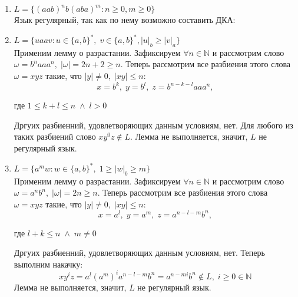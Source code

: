 \documentclass{article}
\begin{document}
    \begin{enumerate}
        \item \(L=\{(aab)^{n}b(aba)^{m} : n \geqslant 0, m \geqslant 0\}\)\\
        Язык регулярный, так как по нему возможно составить ДКА:
        \begin{center}
        \end{center}
    
        \item \(L = \{uaav : u \in \{a, b\}^*, \; v \in \{a, b\}^*, |u|_b \geqslant |v|_a\}\)\\
        Применим лемму о разрастании. Зафиксируем \(\forall n \in \mathbb{N} \) и рассмотрим слово \(\omega = b^{n}aaa^{n}, \; |\omega| = 2n + 2 \geq n\). Теперь рассмотрим все разбиения этого слова \(\omega = xyz\) такие, что \(|y| \neq 0, \; |xy| \leq n\):
        $$x = b^{k}, \; y = b^{l}, \; z = b^{n - k - l}aaa^n,$$ \begin{center}
            где \(1 \leq k + l \leq n \; \wedge \; l > 0\)
        \end{center} 
        Дргуих разбиенний, удовлетворяющих данным условиям, нет.
        Для любого из таких разбиений слово \(xy^0z \notin L\). Лемма не выполняется, значит, \(L\) не регулярный язык.
        
        \item \(L = \{a^mw : w \in \{a, b\}^{*}, \; 1 \geqslant |w|_b \geqslant m\}\)\\
        Применим лемму о разрастании. Зафиксируем \(\forall n \in \mathbb{N} \) и рассмотрим слово \(\omega = a^nb^n, \; |\omega| = 2n \geqslant n\). Теперь рассмотрим все разбиения этого слова \(\omega = xyz\) такие, что \(|y| \neq 0, \; |xy| \leq n\):
        $$x = a^{l}, \; y = a^{m}, \; z = a^{n-l-m}b^{n},$$ 
        \begin{center}
            где \(l + k \leqslant n \; \wedge \; m \ne 0\)
        \end{center} 
        Дргуих разбиенний, удовлетворяющих данным условиям, нет. Теперь выполним накачку: 
        $$xy^{i}z = a^{l}(a^{m})^{i}a^{n-l-m}b^{n} = a^{n-mi}b^{n} \notin L, \; i 
        \geqslant 0 \in \mathbb{N} $$
        Лемма не выполняется, значит, \(L\) не регулярный язык.
        

\end{enumerate}
\end{document}
